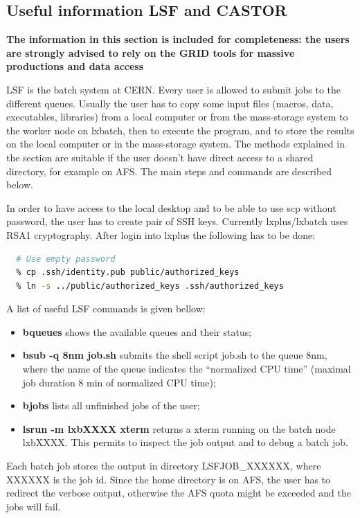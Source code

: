 \documentclass[12pt,a4paper,twoside]{article}
\begin{document}
\subsection{Useful information LSF and CASTOR}

\textbf{The information in this section is included for completeness: the
  users are strongly advised to rely on the GRID tools for massive
  productions and data access}

LSF is the batch system at CERN. Every user is allowed to submit jobs
to the different queues. Usually the user has to copy some input files
(macros, data, executables, libraries) from a local computer or from
the mass-storage system to the worker node on lxbatch, then to execute
the program, and to store the results on the local computer or in the
mass-storage system. The methods explained in the section are suitable
if the user doesn't have direct access to a shared directory, for
example on AFS. The main steps and commands are described below.

In order to have access to the local desktop and to be able to use scp
without password, the user has to create pair of SSH keys. Currently
lxplus/lxbatch uses RSA1 cryptography. After login into lxplus the
following has to be done:

\begin{lstlisting}[language=sh]
  % ssh-keygen -t rsa1
  # Use empty password
  % cp .ssh/identity.pub public/authorized_keys
  % ln -s ../public/authorized_keys .ssh/authorized_keys
\end{lstlisting}

A list of useful LSF commands is given bellow:
\begin{itemize}
\item \textbf{bqueues} shows the available queues and their status;
\item \textbf{ bsub -q 8nm job.sh} submits the shell script job.sh to
  the queue 8nm, where the name of the queue indicates the
  ``normalized CPU time'' (maximal job duration 8 min of normalized CPU time);
\item \textbf{bjobs} lists all unfinished jobs of the user;
\item \textbf{lsrun -m lxbXXXX xterm} returns a xterm running on the
  batch node lxbXXXX. This permits to inspect the job output and to
  debug a batch job.
\end{itemize}

Each batch job stores the output in directory LSFJOB\_XXXXXX, where
XXXXXX is the job id. Since the home directory is on AFS, the user has
to redirect the verbose output, otherwise the AFS quota might be
exceeded and the jobs will fail.
\end{document}
